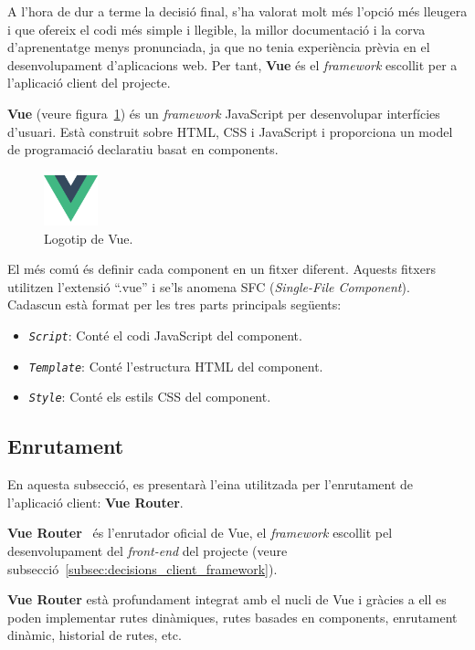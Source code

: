 \documentclass[a4paper,12pt]{ThesisStyle}
\begin{document}
A l'hora de dur a terme la decisió final, s'ha valorat molt més l'opció més lleugera i que ofereix el codi més simple i llegible, la millor documentació i la corva d'aprenentatge menys pronunciada, ja que no tenia experiència prèvia en el desenvolupament d'aplicacions web. Per tant, \textbf{Vue} és el \textit{framework} escollit per a l'aplicació client del projecte.

\textbf{Vue} (veure figura~\ref{img:logo_vue}) és un \textit{framework} JavaScript per desenvolupar interfícies d'usuari. Està construit sobre HTML, CSS i JavaScript i proporciona un model de programació declaratiu basat en components.

\begin{figure}[H]
  \centering
  \includegraphics[width=0.14\textwidth]{assets/logos/Vue.png}
  \caption{\label{img:logo_vue}Logotip de Vue.}
\end{figure}

El més comú és definir cada component en un fitxer diferent. Aquests fitxers utilitzen l'extensió ``.vue'' i se'ls anomena SFC (\textit{Single-File Component}). Cadascun està format per les tres parts principals següents:
\begin{itemize}
  \item \texttt{\textit{Script}}: Conté el codi JavaScript del component.
  \item \texttt{\textit{Template}}: Conté l'estructura HTML del component.
  \item \texttt{\textit{Style}}: Conté els estils CSS del component.
\end{itemize}

\subsection{Enrutament}
\label{subsec:decisions_client_enrutament}

En aquesta subsecció, es presentarà l'eina utilitzada per l'enrutament de l'aplicació client: \textbf{Vue Router}.

\textbf{Vue Router}~\cite{VueRouter} és l'enrutador oficial de Vue, el \textit{framework} escollit pel desenvolupament del \textit{front-end} del projecte (veure subsecció~\ref{subsec:decisions_client_framework}).

\textbf{Vue Router} està profundament integrat amb el nucli de Vue i gràcies a ell es poden implementar rutes dinàmiques, rutes basades en components, enrutament dinàmic, historial de rutes, etc.
\end{document}
